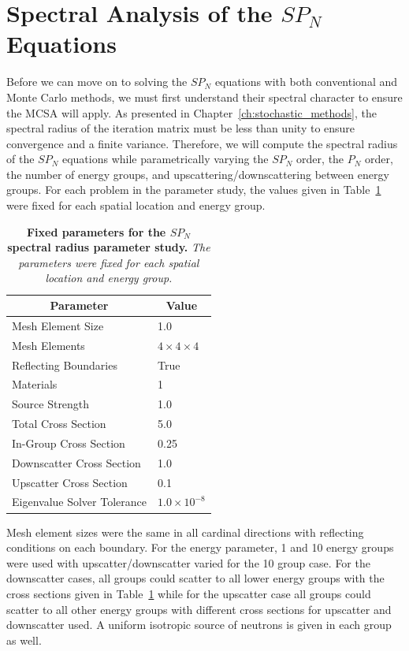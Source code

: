\section{Spectral Analysis of the $SP_N$ Equations}
\label{sec:spn_spectral_analysis}
Before we can move on to solving the $SP_N$ equations with both
conventional and Monte Carlo methods, we must first understand their
spectral character to ensure the MCSA will apply. As presented in
Chapter~\ref{ch:stochastic_methods}, the spectral radius of the
iteration matrix must be less than unity to ensure convergence and a
finite variance. Therefore, we will compute the spectral radius of the
$SP_N$ equations while parametrically varying the $SP_N$ order, the
$P_N$ order, the number of energy groups, and
upscattering/downscattering between energy groups. For each problem in
the parameter study, the values given in
Table~\ref{tab:spn_fixed_parameters} were fixed for each spatial
location and energy group.
\begin{table}[t!]
  \begin{center}
    \begin{tabular}{ll}\hline\hline
      \multicolumn{1}{c}{Parameter}& 
      \multicolumn{1}{c}{Value} \\\hline
      Mesh Element Size & 1.0 \\
      Mesh Elements & $4 \times 4 \times 4$ \\
      Reflecting Boundaries & True \\
      Materials & 1 \\
      Source Strength & 1.0 \\
      Total Cross Section & 5.0 \\
      In-Group Cross Section & 0.25 \\
      Downscatter Cross Section & 1.0 \\
      Upscatter Cross Section & 0.1 \\
      Eigenvalue Solver Tolerance & $1.0\times10^{-8}$ \\
      \hline\hline
    \end{tabular}
  \end{center}
  \caption{\textbf{Fixed parameters for the $SP_N$ spectral radius
      parameter study.} \textit{The parameters were fixed for each
      spatial location and energy group.}}
  \label{tab:spn_fixed_parameters}
\end{table}
Mesh element sizes were the same in all cardinal directions with
reflecting conditions on each boundary. For the energy parameter, 1
and 10 energy groups were used with upscatter/downscatter varied for
the 10 group case. For the downscatter cases, all groups could scatter
to all lower energy groups with the cross sections given in
Table~\ref{tab:spn_fixed_parameters} while for the upscatter case all
groups could scatter to all other energy groups with different cross
sections for upscatter and downscatter used. A uniform isotropic
source of neutrons is given in each group as well.

